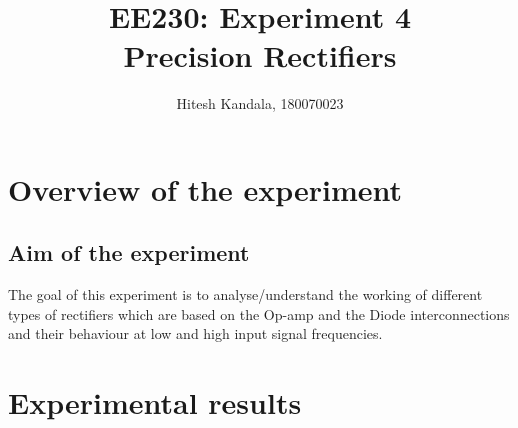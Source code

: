 \documentclass[12pt]{article}
\title{EE230: Experiment 4\\
Precision Rectifiers}
\author{Hitesh Kandala, 180070023}
\begin{document}
\maketitle

\section{Overview of the experiment}

\subsection{Aim of the experiment}
The goal of this experiment is to analyse/understand the working of different types of rectifiers which are based on the Op-amp and the Diode interconnections and their behaviour at low and high input signal frequencies.


       
\section{Experimental results}
\end{document}
